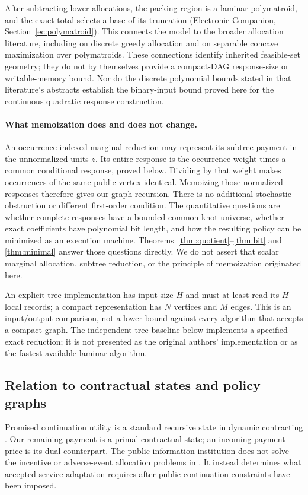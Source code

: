 After subtracting lower allocations, the packing region is a laminar polymatroid, and the exact total selects a base of its truncation (Electronic Companion, Section~\ref{ec:polymatroid}). This connects the model to the broader allocation literature, including \citet{FedergruenGroenevelt1986} on discrete greedy allocation and \citet{Groenevelt1991} on separable concave maximization over polymatroids. These connections identify inherited feasible-set geometry; they do not by themselves provide a compact-DAG response-size or writable-memory bound. Nor do the discrete polynomial bounds stated in that literature's abstracts establish the binary-input bound proved here for the continuous quadratic response construction.

\paragraph{What memoization does and does not change.}
An occurrence-indexed marginal reduction may represent its subtree payment in the unnormalized units $z$. Its entire response is the occurrence weight times a common conditional response, proved below. Dividing by that weight makes occurrences of the same public vertex identical. Memoizing those normalized responses therefore gives our graph recursion. There is no additional stochastic obstruction or different first-order condition. The quantitative questions are whether complete responses have a bounded common knot universe, whether exact coefficients have polynomial bit length, and how the resulting policy can be minimized as an execution machine. Theorems~\ref{thm:quotient}--\ref{thm:bit} and \ref{thm:minimal} answer those questions directly. We do not assert that scalar marginal allocation, subtree reduction, or the principle of memoization originated here.

An explicit-tree implementation has input size $H$ and must at least read its $H$ local records; a compact representation has $N$ vertices and $M$ edges. This is an input/output comparison, not a lower bound against every algorithm that accepts a compact graph. The independent tree baseline below implements a specified exact reduction; it is not presented as the original authors' implementation or as the fastest available laminar algorithm.

\subsection{Relation to contractual states and policy graphs}
Promised continuation utility is a standard recursive state in dynamic contracting \citep{SpearSrivastava1987,ThomasWorrall1988,ChenSunXiao2020}. Our remaining payment is a primal contractual state; an incoming payment price is its dual counterpart. The public-information institution does not solve the incentive or adverse-event allocation problems in \citet{ChenSunXiao2020,LiangSunTangZhang2023}. It instead determines what accepted service adaptation requires after public continuation constraints have been imposed.

